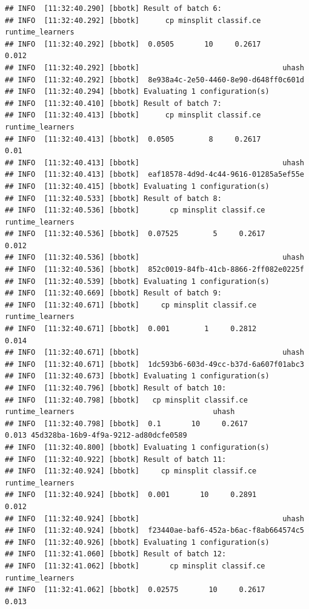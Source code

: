 \documentclass[
]{scrbook}
\begin{document}
\begin{verbatim}
## INFO  [11:32:40.290] [bbotk] Result of batch 6: 
## INFO  [11:32:40.292] [bbotk]      cp minsplit classif.ce runtime_learners 
## INFO  [11:32:40.292] [bbotk]  0.0505       10     0.2617            0.012 
## INFO  [11:32:40.292] [bbotk]                                 uhash 
## INFO  [11:32:40.292] [bbotk]  8e938a4c-2e50-4460-8e90-d648ff0c601d 
## INFO  [11:32:40.294] [bbotk] Evaluating 1 configuration(s) 
## INFO  [11:32:40.410] [bbotk] Result of batch 7: 
## INFO  [11:32:40.413] [bbotk]      cp minsplit classif.ce runtime_learners 
## INFO  [11:32:40.413] [bbotk]  0.0505        8     0.2617             0.01 
## INFO  [11:32:40.413] [bbotk]                                 uhash 
## INFO  [11:32:40.413] [bbotk]  eaf18578-4d9d-4c44-9616-01285a5ef55e 
## INFO  [11:32:40.415] [bbotk] Evaluating 1 configuration(s) 
## INFO  [11:32:40.533] [bbotk] Result of batch 8: 
## INFO  [11:32:40.536] [bbotk]       cp minsplit classif.ce runtime_learners 
## INFO  [11:32:40.536] [bbotk]  0.07525        5     0.2617            0.012 
## INFO  [11:32:40.536] [bbotk]                                 uhash 
## INFO  [11:32:40.536] [bbotk]  852c0019-84fb-41cb-8866-2ff082e0225f 
## INFO  [11:32:40.539] [bbotk] Evaluating 1 configuration(s) 
## INFO  [11:32:40.669] [bbotk] Result of batch 9: 
## INFO  [11:32:40.671] [bbotk]     cp minsplit classif.ce runtime_learners 
## INFO  [11:32:40.671] [bbotk]  0.001        1     0.2812            0.014 
## INFO  [11:32:40.671] [bbotk]                                 uhash 
## INFO  [11:32:40.671] [bbotk]  1dc593b6-603d-49cc-b37d-6a607f01abc3 
## INFO  [11:32:40.673] [bbotk] Evaluating 1 configuration(s) 
## INFO  [11:32:40.796] [bbotk] Result of batch 10: 
## INFO  [11:32:40.798] [bbotk]   cp minsplit classif.ce runtime_learners                                uhash 
## INFO  [11:32:40.798] [bbotk]  0.1       10     0.2617            0.013 45d328ba-16b9-4f9a-9212-ad80dcfe0589 
## INFO  [11:32:40.800] [bbotk] Evaluating 1 configuration(s) 
## INFO  [11:32:40.922] [bbotk] Result of batch 11: 
## INFO  [11:32:40.924] [bbotk]     cp minsplit classif.ce runtime_learners 
## INFO  [11:32:40.924] [bbotk]  0.001       10     0.2891            0.012 
## INFO  [11:32:40.924] [bbotk]                                 uhash 
## INFO  [11:32:40.924] [bbotk]  f23440ae-baf6-452a-b6ac-f8ab664574c5 
## INFO  [11:32:40.926] [bbotk] Evaluating 1 configuration(s) 
## INFO  [11:32:41.060] [bbotk] Result of batch 12: 
## INFO  [11:32:41.062] [bbotk]       cp minsplit classif.ce runtime_learners 
## INFO  [11:32:41.062] [bbotk]  0.02575       10     0.2617            0.013 

\end{verbatim}
\end{document}

